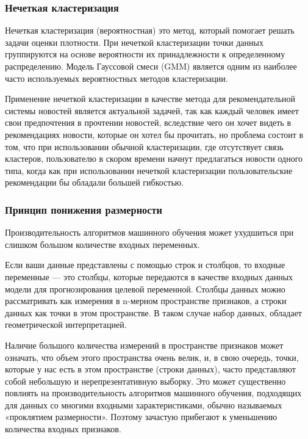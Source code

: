 \subsubsection{Нечеткая кластеризация}

Нечеткая кластеризация (вероятностная) это метод, который помогает решать задачи оценки плотности. При нечеткой кластеризации точки данных группируются на основе вероятности их принадлежности к определенному распределению. Модель Гауссовой смеси (GMM) является одним из наиболее часто используемых вероятностных методов кластеризации.

Применение нечеткой кластеризации в качестве метода для рекомендательной
системы новостей является актуальной задачей, так как каждый человек имеет
свои предпочтения в прочтении новостей, вследствие чего он хочет видеть в
рекомендациях новости, которые он хотел бы прочитать, но проблема состоит в
том, что при использовании обычной кластеризации, где отсутствует связь
кластеров, пользователю в скором времени начнут предлагаться новости одного
типа, когда как при использовании нечеткой кластеризации пользовательские
рекомендации бы обладали большей гибкостью. \cite{NewsClust}

\subsubsection{Принцип понижения размерности}

Производительность алгоритмов машинного обучения может ухудшиться при слишком большом количестве входных переменных.

Если ваши данные представлены с помощью строк и столбцов, то входные переменные — это столбцы, которые передаются в качестве входных данных модели для прогнозирования целевой переменной. Столбцы данных можно рассматривать как измерения в n-мерном пространстве признаков, а строки данных как точки в этом пространстве. В таком случае набор данных, обладает геометрической интерпретацией.

Наличие большого количества измерений в пространстве признаков может означать, что объем этого пространства очень велик, и, в свою очередь, точки, которые у нас есть в этом пространстве (строки данных), часто представляют собой небольшую и нерепрезентативную выборку. Это может существенно повлиять на производительность алгоритмов машинного обучения, подходящих для данных со многими входными характеристиками, обычно называемых «проклятием размерности». Поэтому зачастую прибегают к уменьшению количества входных признаков.

